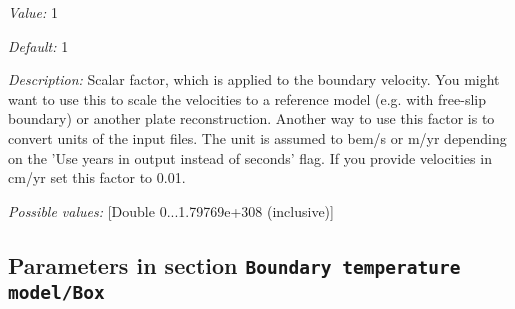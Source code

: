 \begin{itemize}
{\it Value:} 1


{\it Default:} 1


{\it Description:} Scalar factor, which is applied to the boundary velocity. You might want to use this to scale the velocities to a reference model (e.g. with free-slip boundary) or another plate reconstruction. Another way to use this factor is to convert units of the input files. The unit is assumed to bem/s or m/yr depending on the 'Use years in output instead of seconds' flag. If you provide velocities in cm/yr set this factor to 0.01.


{\it Possible values:} [Double 0...1.79769e+308 (inclusive)]
\end{itemize}

\subsection{Parameters in section \tt Boundary temperature model/Box}
\label{parameters:Boundary_20temperature_20model/Box}

